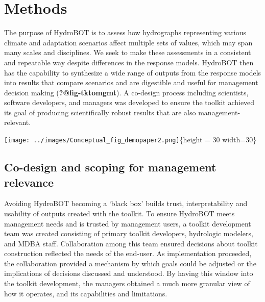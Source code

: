 \documentclass[
  number]{elsarticle}
\begin{document}
\hypertarget{methods}{%
\section{Methods}\label{methods}}

The purpose of HydroBOT is to assess how hydrographs representing
various climate and adaptation scenarios affect multiple sets of values,
which may span many scales and disciplines. We seek to make these
assessments in a consistent and repeatable way despite differences in
the response models. HydroBOT then has the capability to synthesize a
wide range of outputs from the response models into results that compare
scenarios and are digestible and useful for management decision making
(\textbf{?@fig-tktomgmt}). A co-design process including scientists,
software developers, and managers was developed to ensure the toolkit
achieved its goal of producing scientifically robust results that are
also management-relevant.

\texttt{[image: ../images/Conceptual\_fig\_demopaper2.png]}\{height = 30
width=30\}

\hypertarget{co-design-and-scoping-for-management-relevance}{%
\subsection{Co-design and scoping for management
relevance}\label{co-design-and-scoping-for-management-relevance}}

Avoiding HydroBOT becoming a `black box' builds trust, interpretability
and usability of outputs created with the toolkit. To ensure HydroBOT
meets management needs and is trusted by management users, a toolkit
development team was created consisting of primary toolkit developers,
hydrologic modelers, and MDBA staff. Collaboration among this team
ensured decisions about toolkit construction reflected the needs of the
end-user. As implementation proceeded, the collaboration provided a
mechanism by which goals could be adjusted or the implications of
decisions discussed and understood. By having this window into the
toolkit development, the managers obtained a much more granular view of
how it operates, and its capabilities and limitations.
\end{document}
